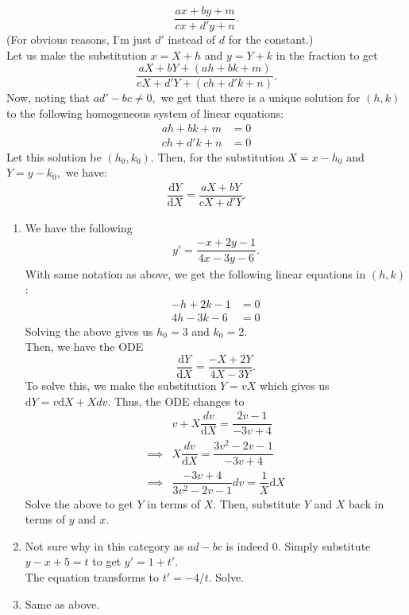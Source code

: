\documentclass[12pt]{article}
\newcommand{\dd}{{\mathrm d}}
\begin{document}
\begin{enumerate}[label = Q.\arabic*.]
	\[\frac{ax + by + m}{cx + d'y + n}.\]
	(For obvious reasons, I'm just $d'$ instead of $d$ for the constant.)\\
	Let us make the substitution $x = X + h$ and $y = Y + k$ in the fraction to get
	\[\frac{aX + bY + (ah + bk + m)}{cX + d'Y + (ch + d'k + n)}.\]
	Now, noting that $ad' - bc \neq 0,$ we get that there is a unique solution for $(h, k)$ to the following homogeneous system of linear equations:
	\begin{align*} 
		ah + bk + m &= 0\\
		ch + d'k + n &= 0
	\end{align*}
	Let this solution be $(h_0, k_0).$ Then, for the substitution $X = x - h_0$ and $Y = y - k_0,$ we have:
	\begin{align*} 
		\dfrac{\dd Y}{\dd X} = \dfrac{aX + bY}{cX + d'Y}.
	\end{align*}
	\begin{enumerate}[label = (\roman*)] 
		\item We have the following
		\begin{align*} 
			y' = \dfrac{-x + 2y - 1}{4x - 3y - 6}.
		\end{align*}
		With same notation as above, we get the following linear equations in $(h, k)$:
		\begin{align*} 
			-h + 2k - 1 &= 0\\
			4h - 3k - 6 &= 0
		\end{align*}
		Solving the above gives us $h_0 = 3$ and $k_0 = 2.$\\
		Then, we have the ODE
		\[\dfrac{\dd Y}{\dd X} = \dfrac{-X + 2Y}{4X - 3Y}.\]
		To solve this, we make the substitution $Y = vX$ which gives us $\dd Y = v\dd X + Xdv.$ Thus, the ODE changes to
		\begin{align*} 
			& v + X\dfrac{dv}{\dd X} = \dfrac{2v - 1}{-3v + 4}\\
			\implies & X\dfrac{dv}{\dd X} = \dfrac{3v^2 -2v - 1}{-3v + 4}\\
			\implies & \dfrac{-3v + 4}{3v^2 - 2v - 1}dv = \dfrac{1}{X}\dd X
		\end{align*}
		Solve the above to get $Y$ in terms of $X.$ Then, substitute $Y$ and $X$ back in terms of $y$ and $x.$
		\item Not sure why in this category as $ad - bc$ is indeed $0.$ Simply substitute $y - x + 5 = t$ to get $y' = 1 + t'.$\\
		The equation transforms to $t' = -4/t.$ Solve.
		\item Same as above.
	\end{enumerate}

\end{enumerate}
\end{document}
